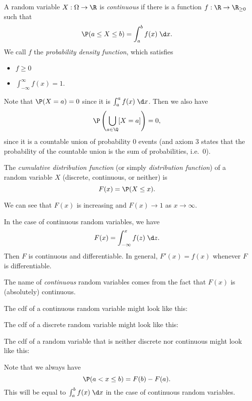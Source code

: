\documentclass[a4paper]{article}
\begin{document}
\begin{defi}
  A random variable $X : \Omega \to \R$ is \emph{continuous} if there is a function $f : \R \to \R_{\geq 0}$ such that
  \[
    \P(a \leq X \leq b) = \int_a^b f(x) \;\d x.
  \]
  We call $f$ the \emph{probability density function}, which satisfies
  \begin{itemize}
    \item $f \geq 0$
    \item $\int_{-\infty}^\infty f(x) = 1$.
  \end{itemize}
\end{defi}
Note that $\P(X = a) = 0$ since it is $\int_a^a f(x)\;\d x$. Then we also have
\[
  \P\left(\bigcup_{a\in \Q} [X = a]\right) = 0,
\]
since it is a countable union of probability 0 events (and axiom 3 states that the probability of the countable union is the sum of probabilities, i.e.\ 0).

\begin{defi}
  The \emph{cumulative distribution function} (or simply \emph{distribution function}) of a random variable $X$ (discrete, continuous, or neither) is
  \[
    F(x) = \P(X \leq x).
  \]
\end{defi}
We can see that $F(x)$ is increasing and $F(x) \to 1$ as $x\to \infty$.

In the case of continuous random variables, we have
\[
  F(x) = \int_{-\infty}^x f(z) \;\d z.
\]
Then $F$ is continuous and differentiable. In general, $F'(x) = f(x)$ whenever $F$ is differentiable.

The name of \emph{continuous} random variables comes from the fact that $F(x)$ is (absolutely) continuous.

The cdf of a continuous random variable might look like this:
\begin{center}
\end{center}
The cdf of a discrete random variable might look like this:
\begin{center}
\end{center}
The cdf of a random variable that is neither discrete nor continuous might look like this:
\begin{center}
\end{center}
Note that we always have
\[
  \P(a < x \leq b) = F(b) - F(a).
\]
This will be equal to $\int_a^b f(x)\;\d x$ in the case of continuous random variables.
\end{document}
